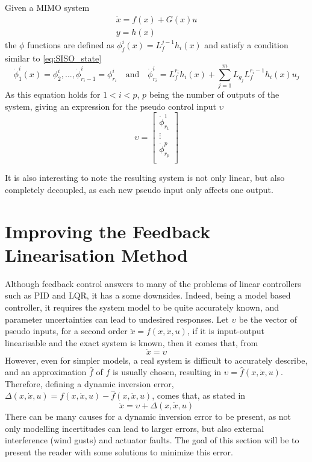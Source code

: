 Given a MIMO system 
\begin{gather}
\dot{x} = f(x) + G(x)u\\
y=h(x)
\end{gather}
the $\phi$ functions are defined as $\phi^i_j(x)=L^{j-1}_fh_i(
x)$ and satisfy a condition similar to \ref{eq:SISO_state} 
\begin{equation}
\dot{\phi}^i_1(x)=\phi^i_2,...,\dot{\phi}^i_{r_i-1}=\phi^i_{r_i} \quad \text{and} \quad \dot{\phi}^i_{r_i}=L_f^{r_i}h_i(x)+\sum^m_{j=1}L_{g_j}L^{r_i-1}_fh_i(x)u_j
\end{equation}
As this equation holds for $1<i<p$, $p$ being the number of outputs of the system, giving an expression for the pseudo control input $\upsilon$
\begin{equation}
\upsilon = 
\begin{bmatrix}
\dot{\phi}^1_{r_1}\\
\vdots\\
\dot{\phi}^p_{r_p}\\
\end{bmatrix}
\end{equation}

It is also interesting to note the resulting system is not only linear, but also completely decoupled, as each new pseudo input only affects one output.

\section{Improving the Feedback Linearisation Method}
\label{section:background/limitations}
Although feedback control answers to many of the problems of linear controllers such as PID and LQR, it has a some downsides. Indeed, being a model based controller, it requires the system model to be quite accurately known, and parameter uncertainties can lead to undesired responses. Let $\upsilon$ be the vector of pseudo inputs, for a second order $\ddot{x} = f(x,\dot{x},u)$, if it is input-output linearisable and the exact system is known, then it comes that, from \cite{YANG+LIN_Adaptive_Flight_Control}
\begin{equation}
\ddot{x}=\upsilon
\end{equation}
However, even for simpler models, a real system is difficult to accurately describe, and an approximation $\hat{f}$ of $f$ is usually chosen, resulting in $\upsilon=\hat{f}(x,\dot{x},u)$. Therefore, defining a dynamic inversion error, $\Delta(x,\dot{x},u)=f(x,\dot{x},u)-\hat{f}(x,\dot{x},u)$, comes that, as stated in \cite{YANG+LIN_Adaptive_Flight_Control}
\begin{equation}
\ddot{x}=\upsilon + \Delta(x,\dot{x},u)
\label{eq:system+error}
\end{equation}
There can be many causes for a dynamic inversion error to be present, as not only modelling incertitudes can lead to larger errors, but also external interference (wind gusts) and actuator faults. The goal of this section will be to present the reader with some solutions to minimize this error. 

